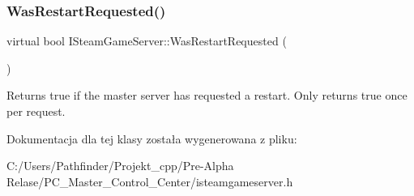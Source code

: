 \subsubsection{\texorpdfstring{Was\+Restart\+Requested()}{WasRestartRequested()}}
{\footnotesize\ttfamily virtual bool I\+Steam\+Game\+Server\+::\+Was\+Restart\+Requested (\begin{DoxyParamCaption}{ }\end{DoxyParamCaption})\hspace{0.3cm}{\ttfamily [pure virtual]}}

Returns true if the master server has requested a restart. Only returns true once per request. 

Dokumentacja dla tej klasy została wygenerowana z pliku\+:\begin{DoxyCompactItemize}
\item 
C\+:/\+Users/\+Pathfinder/\+Projekt\+\_\+cpp/\+Pre-\/\+Alpha Relase/\+P\+C\+\_\+\+Master\+\_\+\+Control\+\_\+\+Center/isteamgameserver.\+h\end{DoxyCompactItemize}
